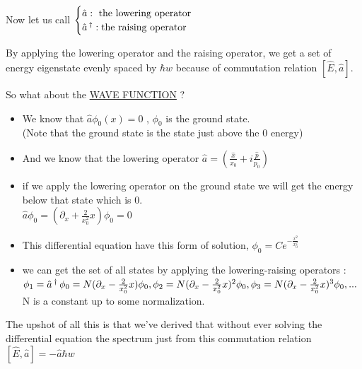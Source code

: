 \documentclass[12pt,oneside]{book}
\begin{document}
Now let us call $\begin{cases}
		\hat{a}:\text{ the lowering operator}       \\
		\hat{a}\operatorname{^\dagger}:\text{the raising operator} \\
	\end{cases}$\\
\begin{center}
	By applying the lowering operator and the raising operator, we get a set of energy eigenstate evenly spaced by $\hbar w$ because of commutation relation $[\hat{E},\hat{a}]$.
\end{center}
So what about the \underline{WAVE FUNCTION} ?
\begin{itemize}
	\item We know that $\hat{a}\phi_0(x) = 0$ , $\phi_0$ is the ground state.\\
	      (Note that the ground state is the state just above the 0 energy)
	\item And we know that the lowering operator $\hat{a} = (\frac{\hat{x}}{x_0} + i \frac{\hat{p}}{p_0})$
	\item if we apply the lowering operator on the ground state we will get the energy below that state which is 0.\\
	      $ \hat{a}\phi_0=\boxed{(\partial_x + \frac{2}{x_0^2}x)\phi_0 = 0}$ \\
	\item This differential equation have this form of solution, $\phi_0 = C e^{-\frac{x^2}{x_0^2}}$
	\item we can get the set of all states by applying the lowering-raising operators : \\
	      $\phi_1 = \hat{a}\operatorname{^\dagger}\phi_0 = N(\partial_x - \frac{2}{x_0^2}x)\phi_0,\\
		      \phi_2 =N(\partial_x - \frac{2}{x_0^2}x)^2\phi_0,\\
		      \phi_3 =N(\partial_x - \frac{2}{x_0^2}x)^3\phi_0,\\
		      ...$ \\
	      N is a constant up to some normalization.
\end{itemize}
\begin{center}
	The upshot of all this is that we've derived that without ever solving the differential equation the spectrum just from this commutation relation $[\hat{E},\hat{a}] = -\hat{a}\hbar w$
\end{center}
\end{document}
